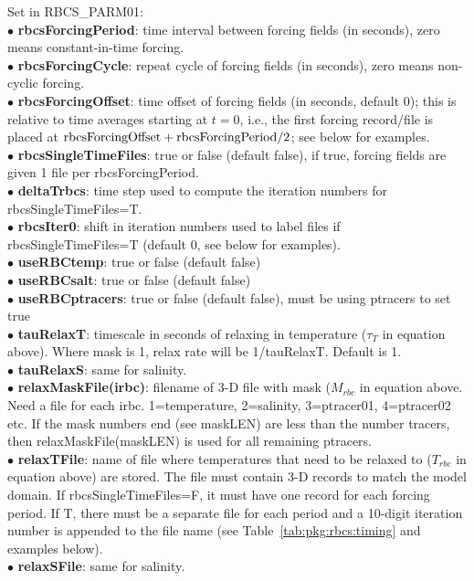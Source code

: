 \vspace{.5cm}
\noindent
Set in {RBCS\_PARM01}:\\
$\bullet$ {\bf rbcsForcingPeriod}: time interval between forcing fields
(in seconds), zero means constant-in-time forcing.\\
$\bullet$ {\bf rbcsForcingCycle}: repeat cycle of forcing fields (in seconds),
zero means non-cyclic forcing.\\
$\bullet$  {\bf rbcsForcingOffset}: time offset of forcing fields
(in seconds, default 0); this is relative to time averages starting at
$t=0$, i.e., the first forcing record/file is placed at
${\rm rbcsForcingOffset+rbcsForcingPeriod}/2$; see below for examples.\\
$\bullet$  {\bf rbcsSingleTimeFiles}: true or false (default false),
if true, forcing fields are given 1 file per rbcsForcingPeriod.\\
$\bullet$  {\bf deltaTrbcs}: time step used to compute the iteration numbers
for rbcsSingleTimeFiles=T.\\
$\bullet$  {\bf rbcsIter0}: shift in iteration numbers used to label files if
rbcsSingleTimeFiles=T (default 0, see below for examples).\\
$\bullet$  {\bf useRBCtemp}: true or false (default false)\\
$\bullet$  {\bf useRBCsalt}: true or false (default false)\\
$\bullet$  {\bf useRBCptracers}: true or false (default false), must be using
ptracers to set true\\
$\bullet$  {\bf tauRelaxT}: timescale in seconds of relaxing
in temperature ($\tau_T$ in equation above). 
Where mask is 1, relax rate will be
1/tauRelaxT. Default is 1.\\
$\bullet$  {\bf tauRelaxS}: same for salinity.\\
$\bullet$  {\bf relaxMaskFile(irbc)}: filename of 3-D file
with mask ($M_{rbc}$ in equation above. 
Need a file for each irbc. 1=temperature,
2=salinity, 3=ptracer01, 4=ptracer02 etc. If the mask numbers
end (see maskLEN) are less than the number tracers, then
relaxMaskFile(maskLEN) is used for all remaining ptracers.\\
$\bullet$  {\bf relaxTFile}: name of file where temperatures
that need to be relaxed to ($T_{rbc}$ in equation above)
are stored.  The file must contain 3-D records to match the model domain.
If rbcsSingleTimeFiles=F, it must have one record for each forcing period.
If T, there must be a separate file for each period and a 10-digit iteration
number is appended to the file name (see Table~\ref{tab:pkg:rbcs:timing} 
and examples below).\\
$\bullet$  {\bf relaxSFile}: same for salinity.\\

